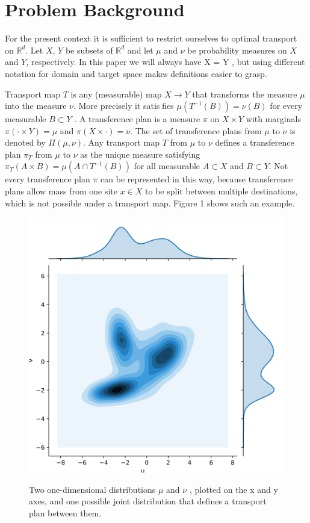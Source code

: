 
\section{Problem Background}

For the present context it is sufficient to restrict ourselves to optimal transport on $\mathbb {R}^d$. Let $X$,  $Y$ be subsets of $\mathbb{R}^d$ and let $\mu$ and $\nu$ be probability measures on $X$ and $Y$, respectively. In this paper we will always have X = Y , but using different notation for domain and target space makes definitions easier to grasp.

Transport map $T$ is any (measurable) map $X  \rightarrow Y$ that transforms the measure $\mu$ into the measure $\nu$. More precisely it satisfies $\mu(T^{-1}(B)) = \nu(B)$ for every measurable $B \subset Y$ . A transference plan is a measure $\pi$ on $X \times Y$ with marginals $\pi(\cdot \times Y) = \mu$ and $\pi(X \times \cdot) = \nu$. The set of transference plans from $\mu$ to $\nu$ is denoted by $\Pi(\mu, \nu)$. Any transport map $T$ from $\mu$ to $\nu$ defines a transference plan $\pi_T$ from $\mu$ to $\nu$ as the unique measure satisfying $\pi_{T}(A \times B)=\mu\left(A \cap T^{-1}(B)\right)$ for all measurable $A \subset X$ and $B \subset Y$. Not every transference plan $\pi$ can be represented in this way, because transference plans allow mass from one site $x \in X$ to be split between multiple destinations, which is not possible under a transport map. Figure 1 shows such an example.

\begin{figure}[htbp]
  \centering
  \includegraphics[width=0.8\linewidth]{img/1d_ot}
  \label{fig:ot}
  \caption{Two one-dimensional distributions $\mu$  and $\nu$ , plotted on the x and y axes, and one possible joint distribution that defines a transport plan between them.}
\end{figure}

